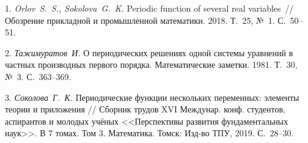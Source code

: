 \litlist

1. {\it Orlov~S.~S., Sokolova~G.~K.} Periodic function of several real variables~// Обозрение прикладной и промышленной математики. 2018. Т.~25, №~1. С.~50--51.

2. {\it Тажимуратов~И.} О периодических решениях одной системы уравнений в частных производных первого порядка. Математические заметки. 1981. Т.~30, №~3. С.~363--369.

3. {\it Соколова~Г.~К.} Периодические функции нескольких переменных: элементы теории и приложения // Сборник трудов XVI Междунар. конф. студентов, аспирантов и молодых учёных <<Перспективы развития фундаментальных наук>>. В 7 томах. Том 3. Математика. Томск: Изд-во ТПУ, 2019. С.~28--30.

